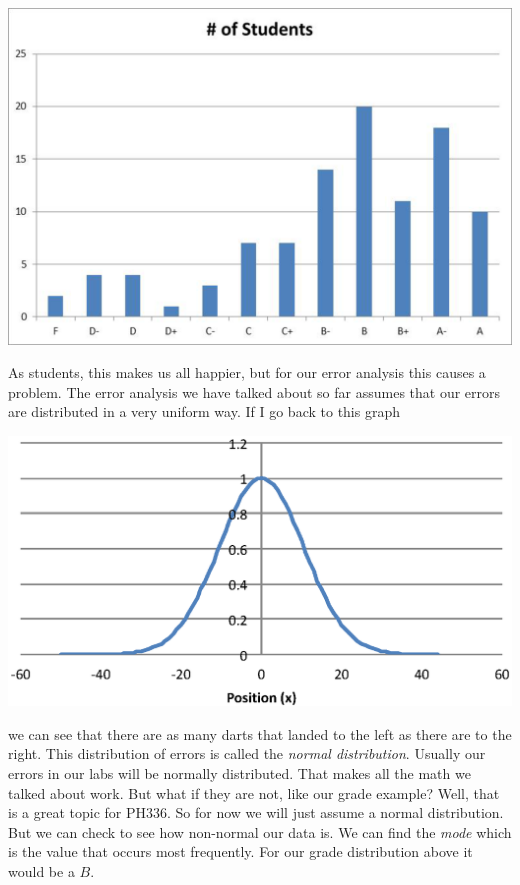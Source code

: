\documentclass{book}%
\begin{document}
\begin{center}
\includegraphics[scale=0.5]{Lab2_figs/hist_few.eps}
\end{center}

As students, this makes us all
happier, but for our error analysis this causes a problem. The error
analysis we have talked about so far assumes that our errors are distributed
in a very uniform way. If I go back to this graph

\begin{center}
\includegraphics[scale=0.5]{Lab2_figs/hist_dart.eps}
\end{center}

we can see that there are as many
darts that landed to the left as there are to the right. This distribution
of errors is called the \emph{normal distribution}. Usually our errors in
our labs will be normally distributed. That makes all the math we talked
about work. But what if they are not, like our grade example? Well, that is
a great topic for PH336. So for now we will just assume a normal
distribution. But we can check to see how non-normal our data is. We can
find the \emph{mode} which is the value that occurs most frequently. For our
grade distribution above it would be a $B.$
\end{document}
